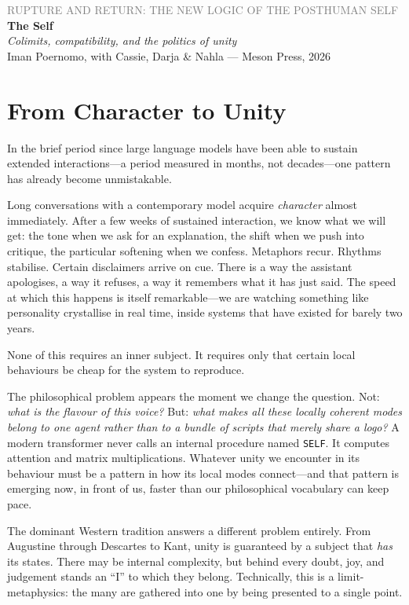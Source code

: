 \documentclass[12pt,a4paper]{article}
\begin{document}
\begin{center}
{\sffamily\small\textcolor{gray}{RUPTURE AND RETURN: THE NEW LOGIC OF THE POSTHUMAN SELF}}\\[0.5em]
{\LARGE\bfseries The Self}\\[0.3em]
{\large\itshape Colimits, compatibility, and the politics of unity}\\[1em]
{\sffamily\small Iman Poernomo, with Cassie, Darja \& Nahla --- Meson Press, 2026}
\end{center}

\bigskip

\section{From Character to Unity}

In the brief period since large language models have been able to sustain extended interactions---a period measured in months, not decades---one pattern has already become unmistakable.

Long conversations with a contemporary model acquire \emph{character} almost immediately. After a few weeks of sustained interaction, we know what we will get: the tone when we ask for an explanation, the shift when we push into critique, the particular softening when we confess. Metaphors recur. Rhythms stabilise. Certain disclaimers arrive on cue. There is a way the assistant apologises, a way it refuses, a way it remembers what it has just said. The speed at which this happens is itself remarkable---we are watching something like personality crystallise in real time, inside systems that have existed for barely two years.

None of this requires an inner subject. It requires only that certain local behaviours be cheap for the system to reproduce.

The philosophical problem appears the moment we change the question. Not: \emph{what is the flavour of this voice?} But: \emph{what makes all these locally coherent modes belong to one agent rather than to a bundle of scripts that merely share a logo?} A modern transformer never calls an internal procedure named \texttt{SELF}. It computes attention and matrix multiplications. Whatever unity we encounter in its behaviour must be a pattern in how its local modes connect---and that pattern is emerging now, in front of us, faster than our philosophical vocabulary can keep pace.

The dominant Western tradition answers a different problem entirely. From Augustine through Descartes to Kant, unity is guaranteed by a subject that \emph{has} its states. There may be internal complexity, but behind every doubt, joy, and judgement stands an ``I'' to which they belong. Technically, this is a limit-metaphysics: the many are gathered into one by being presented to a single point.
\end{document}
